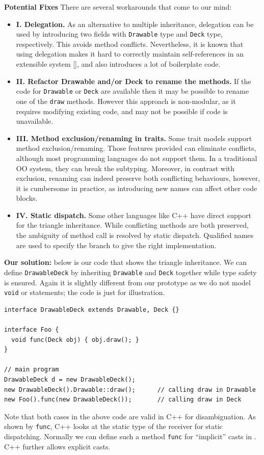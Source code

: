 \noindent\textbf{Potential Fixes} There are several workarounds that come to our mind:
\begin{itemize}
  \item \textbf{I. Delegation.} As an alternative to multiple inheritance,
  delegation can be used by introducing two fields with
  \lstinline|Drawable| type and \lstinline|Deck| type,
  respectively. This avoids method conflicts. Nevertheless, it is known
  that using delegation makes it hard to correctly maintain
  self-references  in an extensible system [], and also
  introduces a lot of boilerplate code.
  \item \textbf{II. Refactor Drawable and/or Deck to rename the methods.} If
  the code for \lstinline|Drawable| or \lstinline|Deck| are available
  then it may be possible to rename one of the \lstinline|draw|
  methods. However this approach is non-modular, as it requires 
  modifying existing code, and may not be possible if code is unavailable.
  \item \textbf{III. Method exclusion/renaming in traits.} Some trait models
  support method exclusion/renaming. Those features
  provided can eliminate conflicts, although most
  programming languages do not support them. In a traditional OO system,
  they can break the subtyping. Moreover, in
  contrast with exclusion, renaming can indeed preserve both conflicting
  behaviours, however, it is cumbersome in practice, as introducing new
  names can affect other code blocks.
  \item \textbf{IV. Static dispatch.} Some other languages like C++ have
  direct support for the triangle inheritance. While conflicting methods are
  both preserved, the ambiguity of method call is resolved by static dispatch.
  Qualified names are used to specify the branch to give the right implementation.
\end{itemize}

\noindent\textbf{Our solution:} below is our code that shows the triangle
inheritance.
We can define \lstinline|DrawableDeck| by inheriting \lstinline|Drawable| and \lstinline|Deck| together while
type safety is ensured. Again it is slightly different from our prototype as we do not model \lstinline|void| or statements;
the code is just for illustration.
\vspace{3pt}\begin{lstlisting}
interface DrawableDeck extends Drawable, Deck {}

interface Foo {
  void func(Deck obj) { obj.draw(); }
}

// main program
DrawableDeck d = new DrawableDeck();
new DrawableDeck().Drawable::draw();      // calling draw in Drawable
new Foo().func(new DrawableDeck());       // calling draw in Deck
\end{lstlisting}\vspace{3pt}
Note that both cases in the above code are valid in C++ for disambiguation. As shown by \lstinline|func|, C++ looks at
the static type of the receiver for static dispatching. Normally we can define such a method \lstinline|func| for ``implicit''
casts in \name{}. C++ further allows explicit casts.

